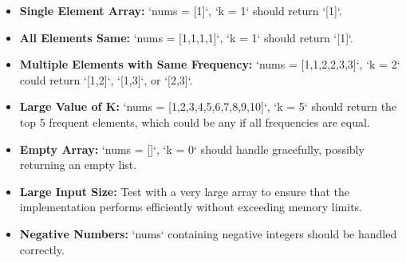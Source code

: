 \begin{itemize}
    \item \textbf{Single Element Array:} `nums = [1]`, `k = 1` should return `[1]`.
    
    \item \textbf{All Elements Same:} `nums = [1,1,1,1]`, `k = 1` should return `[1]`.
    
    \item \textbf{Multiple Elements with Same Frequency:} `nums = [1,1,2,2,3,3]`, `k = 2` could return `[1,2]`, `[1,3]`, or `[2,3]`.
    
    \item \textbf{Large Value of K:} `nums = [1,2,3,4,5,6,7,8,9,10]`, `k = 5` should return the top 5 frequent elements, which could be any if all frequencies are equal.
    
    \item \textbf{Empty Array:} `nums = []`, `k = 0` should handle gracefully, possibly returning an empty list.
    
    \item \textbf{Large Input Size:} Test with a very large array to ensure that the implementation performs efficiently without exceeding memory limits.
    
    \item \textbf{Negative Numbers:} `nums` containing negative integers should be handled correctly.
\end{itemize}

\printindex
